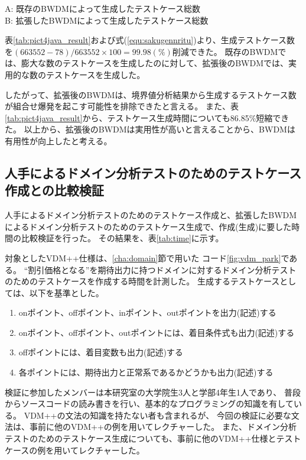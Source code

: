 \documentclass[uplatex, report, a4j, 10pt]{jsbook}
\begin{document}
\begin{center}
  A: 既存のBWDMによって生成したテストケース総数\\
  B: 拡張したBWDMによって生成したテストケース総数\\
\end{center}

表\ref{tab:pict4java_result}および式(\ref{equ:sakugennritu})より、生成テストケース数を$(663552-78)/663552 \times 100=99.98(\%)$削減できた。
既存のBWDMでは、膨大な数のテストケースを生成したのに対して、拡張後のBWDMでは、実用的な数のテストケースを生成した。

したがって、拡張後のBWDMは、境界値分析結果から生成するテストケース数が組合せ爆発を起こす可能性を排除できたと言える。
また、表\ref{tab:pict4java_result}から、テストケース生成時間についても86.85\%短縮できた。
以上から、拡張後のBWDMは実用性が高いと言えることから、BWDMは有用性が向上したと考える。

\subsection{人手によるドメイン分析テストのためのテストケース作成との比較検証}\label{sec:domain_exam}

人手によるドメイン分析テストのためのテストケース作成と、拡張したBWDMによるドメイン分析テストのためのテストケース生成で、作成(生成)に要した時間の比較検証を行った。
その結果を、表\ref{tab:time}に示す。

対象としたVDM++仕様は、\ref{cha:domain}節で用いた コード\ref{fig:vdm_park}である。
``割引価格となる''を期待出力に持つドメインに対するドメイン分析テストのためのテストケースを作成する時間を計測した。
生成するテストケースとしては、以下を基準とした。
\begin{enumerate}
  \item onポイント、offポイント、inポイント、outポイントを出力(記述)する
  \item onポイント、offポイント、outポイントには、着目条件式も出力(記述)する
  \item offポイントには、着目変数も出力(記述)する
  \item 各ポイントには、期待出力と正常系であるかどうかも出力(記述)する
\end{enumerate}

検証に参加したメンバーは本研究室の大学院生3人と学部4年生1人であり、
普段からソースコードの読み書きを行い、基本的なプログラミングの知識を有している。
VDM++の文法の知識を持たない者も含まれるが、
今回の検証に必要な文法は、事前に他のVDM++の例を用いてレクチャーした。
また、ドメイン分析テストのためのテストケース生成についても、事前に他のVDM++仕様とテストケースの例を用いてレクチャーした。
\end{document}
